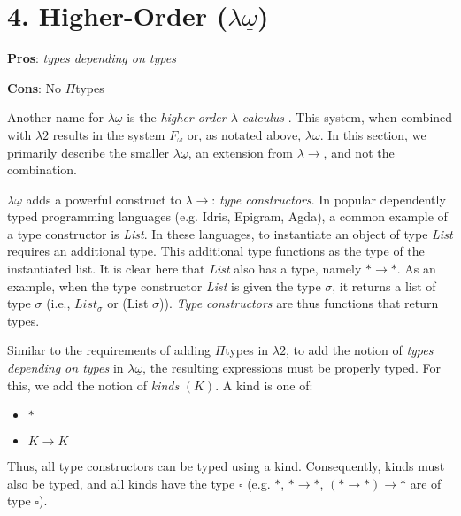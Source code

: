 \documentclass[9pt,preprint,nocopyrightspace,computermodern]{sigplanconf} %
\begin{document}
\section*{4. Higher-Order (\(\lambda\underline\omega\))}
\begin{flushleft}
  \textbf{Pros}: \textit{types depending on types}
  \par  
  \textbf{Cons}: No \(\Pi\)types
\end{flushleft}
Another name for \(\lambda\underline\omega\) is the
\textit{higher order \(\lambda\)-calculus} \cite{gir}. This system,
when combined with \(\lambda 2\) results in the system \(F_\omega\) or,
as notated above, \(\lambda\omega\). In this section, we primarily
describe the smaller \(\lambda\underline\omega\), an extension
from \(\lambda\!\!\rightarrow\), and not the combination.

\(\lambda\underline\omega\) adds a powerful construct to \(\lambda\!\!\rightarrow\):
\textit{type constructors}. In popular dependently typed programming languages
(e.g. Idris, Epigram, Agda), a common example of a type constructor is \textit{List}.
In these languages, to instantiate an object of type \textit{List} requires an
additional type. This additional type functions as the type of the instantiated list.
It is clear here that \textit{List} also has a type, namely \(*\rightarrow *\). As
an example, when the type constructor \textit{List} is given the type \(\sigma\),
it returns a list of type \(\sigma\) (i.e., \(List_\sigma\) or (List \(\sigma\))).
\textit{Type constructors} are thus functions that return types.

Similar to the requirements of adding \(\Pi\)types in \(\lambda2\), to add the
notion of \textit{types depending on types} in \(\lambda\underline\omega\), the
resulting expressions must be properly typed. For this, we add the notion
of \textit{kinds} \((K)\). A kind is one of:
\begin{itemize}
\item \(*\)
\item \(K\rightarrow K\)
\end{itemize}
Thus, all type constructors can be typed using a kind. Consequently, kinds must
also be typed, and all kinds have the type \(\square\) (e.g. \(*\), \(*\rightarrow *\),
\((*\rightarrow *)\rightarrow *\) are of type \(\square\)).
\end{document}
